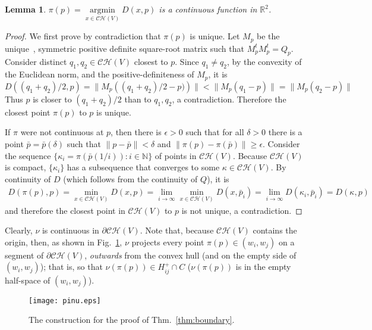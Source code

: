 \documentclass[11pt]{article}
\newtheorem{lemma}[theorem]{Lemma}
\begin{document}
\begin{lemma}\label{lem:piC0}
$\pi(p) = \underset{x\in\mathcal{CH}(V)}{\operatorname{argmin}}D(x,p)$ is a continuous function in $\mathbb{R}^2$. 
\end{lemma}
\begin{proof}
We first prove by contradiction that $\pi(p)$ is unique. 
Let $M_p$ be the unique~\cite{avd}, symmetric positive definite square-root matrix such that $M_p^t M^t_p = Q_p$. 
Consider distinct
$q_1,q_2\in\mathcal{CH}(V)$ closest to $p$. 
Since $q_1\neq q_2$, by the convexity of the Euclidean norm, and the positive-definiteness of $M_p$, it is
\[ D((q_1+q_2)/2,p) = \|M_p\left( (q_1 + q_2)/2 - p)\right)\| < \| M_p\left(q_1- p\right)\| = \| M_p\left(q_2 - p\right)\| \]
Thus $p$ is closer to $(q_1+q_2)/2$ than to
$q_1,q_2$, a contradiction. Therefore the closest point $\pi(p)$ to $p$ is
unique. 

If $\pi$ were not continuous at $p$, then there is $\epsilon > 0$ such that 
for all $\delta > 0$ there is a point $\bar{p}=\bar{p}(\delta)$ such that $\|p-\bar{p}\| < \delta$
and $\|\pi(p) - \pi(\bar{p})\| \ge \epsilon$. 
Consider the sequence $\{\kappa_i = \pi(\bar{p}(1/i)) : i\in\mathbb{N}\}$ of points in
$\mathcal{CH}(V)$. Because $\mathcal{CH}(V)$ is compact, $\{\kappa_i\}$ has a
subsequence that converges to some $\kappa\in\mathcal{CH}(V)$. 
By continuity of $D$ (which follows from the continuity of $Q$), it is
\begin{eqnarray*}
	D(\pi(p),p) = \min_{x\in\mathcal{CH}(V)} D(x,p) = \displaystyle{  \lim_{i\rightarrow\infty} \min_{x\in\mathcal{CH}(V)} D(x,\bar{p}_i) } 
			= \displaystyle{ \lim_{i\rightarrow\infty} D(\kappa_i,\bar{p}_i) = D(\kappa, p)  }
\end{eqnarray*}
and therefore the closest point in $\mathcal{CH}(V)$ to $p$ is not unique, a
contradiction. 
\end{proof}




Clearly, $\nu$ is continuous in $\partial\mathcal{CH}(V)$. 
Note that, because $\mathcal{CH}(V)$ contains the origin, then, as shown in Fig.~\ref{fig:pinu}, $\nu$ projects 
every point $\pi(p)\in (w_i,w_j)$ on a segment of $\partial\mathcal{CH}(V)$, 
\emph{outwards} from the convex hull (and on the empty side of
$(w_i,w_j)$); that is, so that $\nu(\pi(p))\in H^{+}_{ij}\cap C$
($\nu(\pi(p))$ is in the empty half-space of $(w_i,w_j)$). 



\begin{figure}[htbp]
   \centering
   	\texttt{[image: pinu.eps]} \caption{The construction for the proof of Thm.~\ref{thm:boundary}.}
\label{fig:pinu}
\end{figure}
\end{document}
